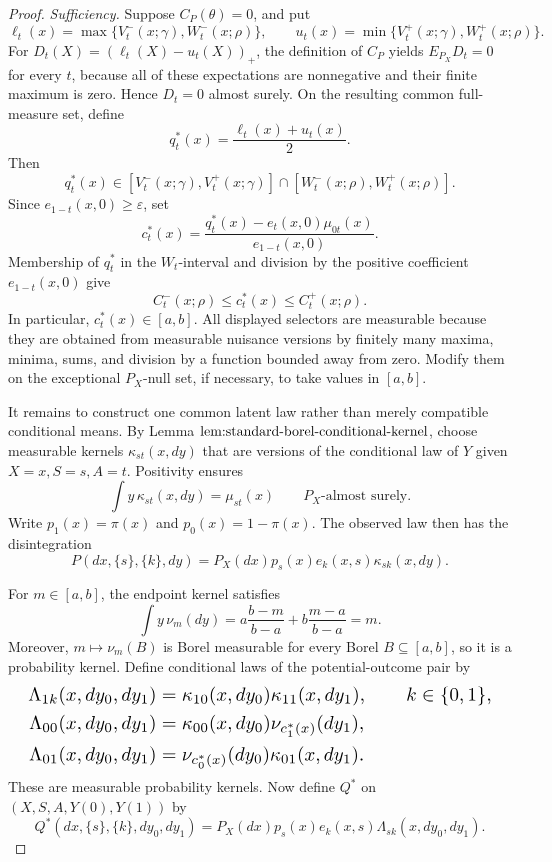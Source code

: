 \documentclass{article}
\begin{document}
\begin{proof}
\emph{Sufficiency.} Suppose \(C_P(\theta)=0\), and put\[\ell_t(x)=\max\{V_t^-(x;\gamma),W_t^-(x;\rho)\},\qquad u_t(x)=\min\{V_t^+(x;\gamma),W_t^+(x;\rho)\}.\]For \(D_t(X)=(\ell_t(X)-u_t(X))_+\), the definition of \(C_P\) yields \(E_{P_X}D_t=0\) for every \(t\), because all of these expectations are nonnegative and their finite maximum is zero. Hence \(D_t=0\) almost surely. On the resulting common full-measure set, define\[q_t^*(x)=\frac{\ell_t(x)+u_t(x)}2.\]Then\[q_t^*(x)\in[V_t^-(x;\gamma),V_t^+(x;\gamma)]\cap[W_t^-(x;\rho),W_t^+(x;\rho)].\]Since \(e_{1-t}(x,0)\ge\varepsilon\), set\[c_t^*(x)=\frac{q_t^*(x)-e_t(x,0)\mu_{0t}(x)}{e_{1-t}(x,0)}.\]Membership of \(q_t^*\) in the \(W_t\)-interval and division by the positive coefficient \(e_{1-t}(x,0)\) give\[C_t^-(x;\rho)\le c_t^*(x)\le C_t^+(x;\rho).\]In particular, \(c_t^*(x)\in[a,b]\). All displayed selectors are measurable because they are obtained from measurable nuisance versions by finitely many maxima, minima, sums, and division by a function bounded away from zero. Modify them on the exceptional \(P_X\)-null set, if necessary, to take values in \([a,b]\).

It remains to construct one common latent law rather than merely compatible conditional means. By Lemma \(\textup{lem:standard-borel-conditional-kernel}\), choose measurable kernels \(\kappa_{st}(x,dy)\) that are versions of the conditional law of \(Y\) given \(X=x,S=s,A=t\). Positivity ensures\[\int y\,\kappa_{st}(x,dy)=\mu_{st}(x)\qquad P_X\text{-almost surely}.\]Write \(p_1(x)=\pi(x)\) and \(p_0(x)=1-\pi(x)\). The observed law then has the disintegration\[P(dx,\{s\},\{k\},dy)=P_X(dx)p_s(x)e_k(x,s)\kappa_{sk}(x,dy).\]

For \(m\in[a,b]\), the endpoint kernel satisfies\[\int y\,\nu_m(dy)=a\frac{b-m}{b-a}+b\frac{m-a}{b-a}=m.\]Moreover, \(m\mapsto\nu_m(B)\) is Borel measurable for every Borel \(B\subseteq[a,b]\), so it is a probability kernel. Define conditional laws of the potential-outcome pair by\[
\makebox[\linewidth][c]{\resizebox{0.98\linewidth}{!}{\par\noindent \makebox[\linewidth][c]{\resizebox{0.98\linewidth}{!}{\(\displaystyle \displaystyle \begin{aligned}\Lambda_{1k}(x,dy_0,dy_1)&=\kappa_{10}(x,dy_0)\kappa_{11}(x,dy_1),\qquad k\in\{0,1\},\\\Lambda_{00}(x,dy_0,dy_1)&=\kappa_{00}(x,dy_0)\nu_{c_1^*(x)}(dy_1),\\\Lambda_{01}(x,dy_0,dy_1)&=\nu_{c_0^*(x)}(dy_0)\kappa_{01}(x,dy_1).\end{aligned}\)}}\par\noindent}}
\]These are measurable probability kernels. Now define \(Q^*\) on \((X,S,A,Y(0),Y(1))\) by\[Q^*(dx,\{s\},\{k\},dy_0,dy_1)=P_X(dx)p_s(x)e_k(x,s)\Lambda_{sk}(x,dy_0,dy_1).\]


\end{proof}
\end{document}
